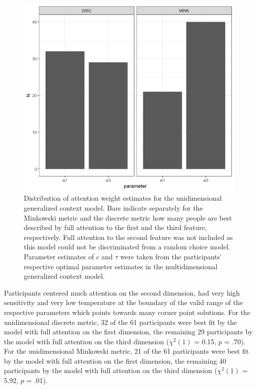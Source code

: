 \documentclass[a4paper,man,natbib]{apa6}
\begin{document}
\begin{figure}[htbp]
\centering
\includegraphics[width = \textwidth]{fig_par_unidim.png}
\caption{Distribution of attention weight estimates for the unidimensional generalized context model. Bars indicate separately for the Minkowski metric and the discrete metric how many people are best described by full attention to the first and the third feature, respectively. Full attention to the second feature was not included as this model could not be discriminated from a random choice model. Parameter estimates of $c$ and $\tau$ were taken from the participants' respective optimal parameter estimates in the multidimensional generalized context model.}
\label{fig:par_unidim}
\end{figure}

Participants centered much attention on the second dimension, had very high sensitivity and very low temperature at the boundary of the valid range of the respective parameters which points towards many corner point solutions. For the unidimensional discrete metric, 32 of the 61 participants were best fit by the model with full attention on the first dimension, the remaining 29 participants by the model with full attention on the third dimension ($\chi^{2}(1)$ = 0.15, $p$ = .70). For the unidimensional Minkowski metric, 21 of the 61 participants were best fit by the model with full attention on the first dimension, the remaining 40 participants by the model with full attention on the third dimension ($\chi^{2}(1)$ = 5.92, $p$ = .01).
\end{document}
